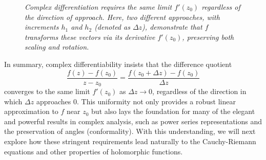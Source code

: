 \begin{figure}[H]
    \caption{\textit{Complex differentiation requires the same limit \(f'(z_0)\) regardless of the direction of approach. Here, two different approaches, with increments \(h_1\) and \(h_2\) (denoted as \(\Delta z\)), demonstrate that \(f\) transforms these vectors via its derivative \(f'(z_0)\), preserving both scaling and rotation.}}
    \label{fig:complex-diff-direction}
\end{figure}

\noindent In summary, complex differentiability insists that the difference quotient
\[
\frac{f(z)-f(z_0)}{z-z_0} = \frac{f(z_0+\Delta z)-f(z_0)}{\Delta z}
\]
converges to the same limit \(f'(z_0)\) as \(\Delta z\to 0\), regardless of the direction in which \(\Delta z\) approaches 0. This uniformity not only provides a robust linear approximation to \(f\) near \(z_0\) but also lays the foundation for many of the elegant and powerful results in complex analysis, such as power series representations and the preservation of angles (conformality). With this understanding, we will next explore how these stringent requirements lead naturally to the Cauchy-Riemann equations and other properties of holomorphic functions. \\

